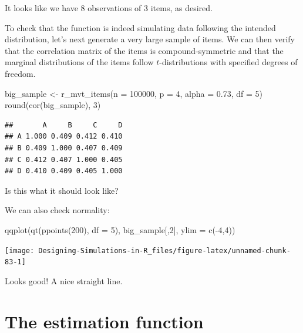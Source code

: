 \documentclass[
]{book}
\newenvironment{Shaded}{\begin{snugshade}}{\end{snugshade}}
\newcommand{\AttributeTok}[1]{\textcolor[rgb]{0.77,0.63,0.00}{#1}}
\newcommand{\DecValTok}[1]{\textcolor[rgb]{0.00,0.00,0.81}{#1}}
\newcommand{\FloatTok}[1]{\textcolor[rgb]{0.00,0.00,0.81}{#1}}
\newcommand{\FunctionTok}[1]{\textcolor[rgb]{0.00,0.00,0.00}{#1}}
\newcommand{\NormalTok}[1]{#1}
\newcommand{\OtherTok}[1]{\textcolor[rgb]{0.56,0.35,0.01}{#1}}
\newcommand{\SpecialCharTok}[1]{\textcolor[rgb]{0.00,0.00,0.00}{#1}}
\begin{document}
It looks like we have 8 observations of 3 items, as desired.

To check that the function is indeed simulating data following the intended distribution, let's next generate a very large sample of items. We can then verify that the correlation matrix of the items is compound-symmetric and that the marginal distributions of the items follow \(t\)-distributions with specified degrees of freedom.

\begin{Shaded}
\begin{Highlighting}[]
\NormalTok{big\_sample }\OtherTok{\textless{}{-}} \FunctionTok{r\_mvt\_items}\NormalTok{(}\AttributeTok{n =} \DecValTok{100000}\NormalTok{, }\AttributeTok{p =} \DecValTok{4}\NormalTok{, }\AttributeTok{alpha =} \FloatTok{0.73}\NormalTok{, }\AttributeTok{df =} \DecValTok{5}\NormalTok{)}
\FunctionTok{round}\NormalTok{(}\FunctionTok{cor}\NormalTok{(big\_sample), }\DecValTok{3}\NormalTok{)}
\end{Highlighting}
\end{Shaded}

\begin{verbatim}
##       A     B     C     D
## A 1.000 0.409 0.412 0.410
## B 0.409 1.000 0.407 0.409
## C 0.412 0.407 1.000 0.405
## D 0.410 0.409 0.405 1.000
\end{verbatim}

Is this what it should look like?

We can also check normality:

\begin{Shaded}
\begin{Highlighting}[]
\FunctionTok{qqplot}\NormalTok{(}\FunctionTok{qt}\NormalTok{(}\FunctionTok{ppoints}\NormalTok{(}\DecValTok{200}\NormalTok{), }\AttributeTok{df =} \DecValTok{5}\NormalTok{), big\_sample[,}\DecValTok{2}\NormalTok{], }\AttributeTok{ylim =} \FunctionTok{c}\NormalTok{(}\SpecialCharTok{{-}}\DecValTok{4}\NormalTok{,}\DecValTok{4}\NormalTok{))}
\end{Highlighting}
\end{Shaded}

\begin{center}\texttt{[image: Designing-Simulations-in-R\_files/figure-latex/unnamed-chunk-83-1]} \end{center}

Looks good! A nice straight line.

\hypertarget{the-estimation-function}{%
\section{The estimation function}\label{the-estimation-function}}
\end{document}

